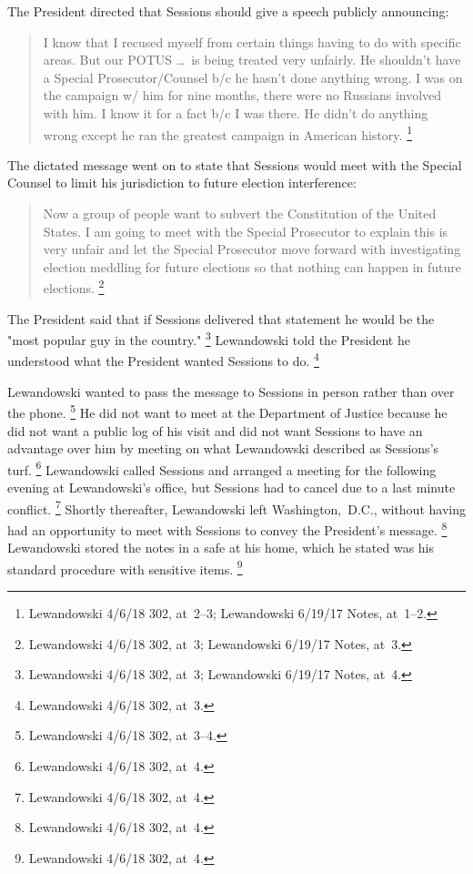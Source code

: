 The President directed that Sessions should give a speech publicly announcing:

\begin{quote}
I know that I recused myself from certain things having to do with specific areas.
But our POTUS \dots\ is being treated very unfairly.
He shouldn't have a Special Prosecutor/Counsel b/c he hasn't done anything wrong.
I was on the campaign w/ him for nine months, there were no Russians involved with him.
I know it for a fact b/c I was there.
He didn't do anything wrong except he ran the greatest campaign in American history.%
\footnote{Lewandowski 4/6/18 302, at~2--3;
Lewandowski 6/19/17 Notes, at~1--2.}
\end{quote}

The dictated message went on to state that Sessions would meet with the Special Counsel to limit his jurisdiction to future election interference:

\begin{quote}
Now a group of people want to subvert the Constitution of the United States.
I am going to meet with the Special Prosecutor to explain this is very unfair and let the Special Prosecutor move forward with investigating election meddling for future elections so that nothing can happen in future elections.%
\footnote{Lewandowski 4/6/18 302, at~3;
Lewandowski 6/19/17 Notes, at~3.}
\end{quote}

The President said that if Sessions delivered that statement he would be the "most popular guy in the country."%
\footnote{Lewandowski 4/6/18 302, at~3;
Lewandowski 6/19/17 Notes, at~4.}
Lewandowski told the President he understood what the President wanted Sessions to do.%
\footnote{Lewandowski 4/6/18 302, at~3.}

Lewandowski wanted to pass the message to Sessions in person rather than over the phone.%
\footnote{Lewandowski 4/6/18 302, at~3--4.}
He did not want to meet at the Department of Justice because he did not want a public log of his visit and did not want Sessions to have an advantage over him by meeting on what Lewandowski described as Sessions's turf.%
\footnote{Lewandowski 4/6/18 302, at~4.}
Lewandowski called Sessions and arranged a meeting for the following evening at Lewandowski's office, but Sessions had to cancel due to a last minute conflict.%
\footnote{Lewandowski 4/6/18 302, at~4.}
Shortly thereafter, Lewandowski left Washington,~D.C., without having had an opportunity to meet with Sessions to convey the President's message.%
\footnote{Lewandowski 4/6/18 302, at~4.}
Lewandowski stored the notes in a safe at his home, which he stated was his standard procedure with sensitive items.%
\footnote{Lewandowski 4/6/18 302, at~4.}

